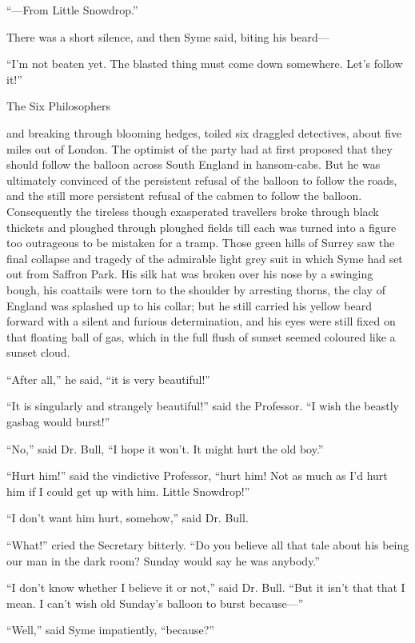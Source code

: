     “⁠—From Little Snowdrop.”

There was a short silence, and then Syme said, biting his beard⁠—

“I’m not beaten yet. The blasted thing must come down somewhere. Let’s follow it!”

\chap[sixphilosophers] The Six Philosophers

 and breaking through blooming hedges, toiled six draggled detectives, about five miles out of London. The optimist of the party had at first proposed that they should follow the balloon across South England in hansom-cabs. But he was ultimately convinced of the persistent refusal of the balloon to follow the roads, and the still more persistent refusal of the cabmen to follow the balloon. Consequently the tireless though exasperated travellers broke through black thickets and ploughed through ploughed fields till each was turned into a figure too outrageous to be mistaken for a tramp. Those green hills of Surrey saw the final collapse and tragedy of the admirable light grey suit in which Syme had set out from Saffron Park. His silk hat was broken over his nose by a swinging bough, his coattails were torn to the shoulder by arresting thorns, the clay of England was splashed up to his collar; but he still carried his yellow beard forward with a silent and furious determination, and his eyes were still fixed on that floating ball of gas, which in the full flush of sunset seemed coloured like a sunset cloud.

“After all,” he said, “it is very beautiful!”

“It is singularly and strangely beautiful!” said the Professor. “I wish the beastly gasbag would burst!”

“No,” said Dr. Bull, “I hope it won’t. It might hurt the old boy.”

“Hurt him!” said the vindictive Professor, “hurt him! Not as much as I’d hurt him if I could get up with him. Little Snowdrop!”

“I don’t want him hurt, somehow,” said Dr. Bull.

“What!” cried the Secretary bitterly. “Do you believe all that tale about his being our man in the dark room? Sunday would say he was anybody.”

“I don’t know whether I believe it or not,” said Dr. Bull. “But it isn’t that that I mean. I can’t wish old Sunday’s balloon to burst because⁠—”

“Well,” said Syme impatiently, “because?”

